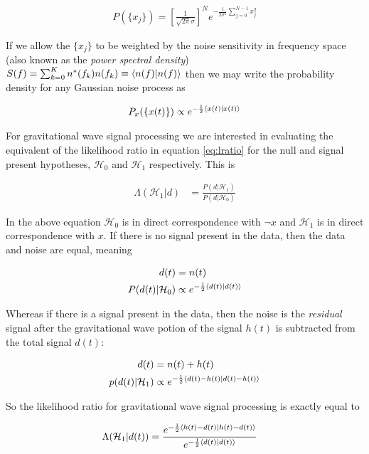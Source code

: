\documentclass[paper=a4, fontsize=11pt]{scrartcl} %
\numberwithin{equation}{section} %
\numberwithin{figure}{section} %
\numberwithin{table}{section} %
\begin{document}
\begin{align}
P(\{x_j\}) = \left[\frac{1}{\sqrt{2 \pi} \sigma}\right]^N e^{-\frac{1}{2 \sigma^2} \sum_{j = 0}^{N - 1}x_j^2}
\end{align}

If we allow the $\{x_j\}$ to be weighted by the noise sensitivity in frequency space (also known as the \textit{power spectral density}) $S(f) = \sum_{k=0}^K n^*(f_k)n(f_k) \equiv \braket{n(f)|n(f)}$ then we may write the probability density for any Gaussian noise process as 

\begin{align}
P_x(\{x(t)\}) \propto e^{-\frac{1}{2}\braket{x(t)|x(t)}}
\end{align}

For gravitational wave signal processing we are interested in evaluating the equivalent of the likelihood ratio  in equation \ref{eq:lratio} for the null and signal present hypotheses, $\mathcal{H}_0$ and $\mathcal{H}_1$ respectively. This is

\begin{align}
\Lambda(\mathcal{H}_1|d) &= \frac{P(d|\mathcal{H}_1)}{P(d|\mathcal{H}_0)}
\end{align}

In the above equation $\mathcal{H}_0$ is in direct correspondence with $\neg x$ and $\mathcal{H}_1$ is in direct correspondence with $x$. If there is no signal present in the data, then the data and noise are equal, meaning 

\begin{align}
d(t) &= n(t) \\
P(d(t)|\mathcal{H}_0) &\propto e^{-\frac{1}{2}\braket{d(t)|d(t)}}
\end{align} 

Whereas if there is a signal present in the data, then the noise is the \textit{residual} signal after the gravitational wave potion of the signal $h(t)$ is subtracted from the total signal $d(t)$: 

\begin{align}
d(t) &= n(t) + h(t) \\
p(d(t)|\mathcal{H}_1) &\propto e^{-\frac{1}{2}\braket{d(t) - h(t)|d(t) - h(t)}}
\end{align}

So the likelihood ratio for gravitational wave signal processing is exactly equal to 

\begin{align}
\Lambda(\mathcal{H}_1|d(t)) &= \frac{e^{-\frac{1}{2}\braket{h(t)-d(t)|h(t)-d(t)}}}{e^{-\frac{1}{2}\braket{d(t)|d(t)}}}
\end{align}
\end{document}
